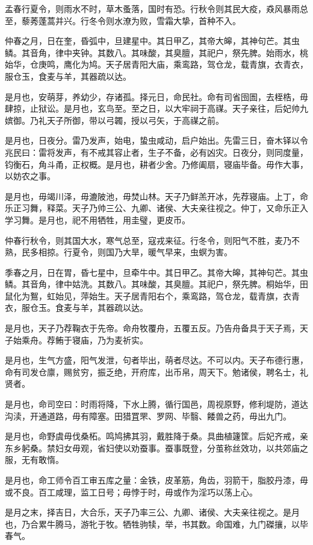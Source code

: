 \documentclass[]{article}
\begin{document}
孟春行夏令，则雨水不时，草木蚤落，国时有恐。行秋令则其民大疫，猋风暴雨总至，藜莠蓬蒿并兴。行冬令则水潦为败，雪霜大挚，首种不入。

仲春之月，日在奎，昏弧中，旦建星中。其日甲乙，其帝大皞，其神句芒。其虫鳞。其音角，律中夹钟。其数八。其味酸，其臭膻，其祀户，祭先脾。始雨水，桃始华，仓庚鸣，鹰化为鸠。天子居青阳大庙，乘鸾路，驾仓龙，载青旗，衣青衣，服仓玉，食麦与羊，其器疏以达。

是月也，安萌芽，养幼少，存诸孤。择元日，命民社。命有司省囹圄，去桎梏，毋肆掠，止狱讼。是月也，玄鸟至。至之日，以大牢祠于高禖。天子亲往，后妃帅九嫔御。乃礼天子所御，带以弓韣，授以弓矢，于高禖之前。

是月也，日夜分。雷乃发声，始电，蛰虫咸动，启户始出。先雷三日，奋木铎以令兆民曰：雷将发声，有不戒其容止者，生子不备，必有凶灾。日夜分，则同度量，钧衡石，角斗甬，正权概。是月也，耕者少舍。乃修阖扇，寝庙毕备。毋作大事，以妨农之事。

是月也，毋竭川泽，毋漉陂池，毋焚山林。天子乃鲜羔开冰，先荐寝庙。上丁，命乐正习舞，释菜。天子乃帅三公、九卿、诸侯、大夫亲往视之。仲丁，又命乐正入学习舞。是月也，祀不用牺牲，用圭璧，更皮币。

仲春行秋令，则其国大水，寒气总至，寇戎来征。行冬令，则阳气不胜，麦乃不熟，民多相掠。行夏令，则国乃大旱，暖气早来，虫螟为害。

季春之月，日在胃，昏七星中，旦牵牛中。其日甲乙。其帝大皞，其神句芒。其虫鳞。其音角，律中姑洗。其数八。其味酸，其臭膻。其祀户，祭先脾。桐始华，田鼠化为鴽，虹始见，萍始生。天子居青阳右个，乘鸾路，驾仓龙，载青旗，衣青衣，服仓玉。食麦与羊，其器疏以达。

是月也，天子乃荐鞠衣于先帝。命舟牧覆舟，五覆五反。乃告舟备具于天子焉，天子始乘舟。荐鲔于寝庙，乃为麦祈实。

是月也，生气方盛，阳气发泄，句者毕出，萌者尽达。不可以内。天子布德行惠，命有司发仓廪，赐贫穷，振乏绝，开府库，出币帛，周天下。勉诸侯，聘名士，礼贤者。

是月也，命司空曰：时雨将降，下水上腾，循行国邑，周视原野，修利堤防，道达沟渎，开通道路，毋有障塞。田猎罝罘、罗网、毕翳、餧兽之药，毋出九门。

是月也，命野虞毋伐桑柘。鸣鸠拂其羽，戴胜降于桑。具曲植籧筐。后妃齐戒，亲东乡躬桑。禁妇女毋观，省妇使以劝蚕事。蚕事既登，分茧称丝效功，以共郊庙之服，无有敢惰。

是月也，命工师令百工审五库之量：金铁，皮革筋，角齿，羽箭干，脂胶丹漆，毋或不良。百工咸理，监工日号；毋悖于时，毋或作为淫巧以荡上心。

是月之末，择吉日，大合乐，天子乃率三公、九卿、诸侯、大夫亲往视之。是月也，乃合累牛腾马，游牝于牧。牺牲驹犊，举，书其数。命国难，九门磔攘，以毕春气。
\end{document}
